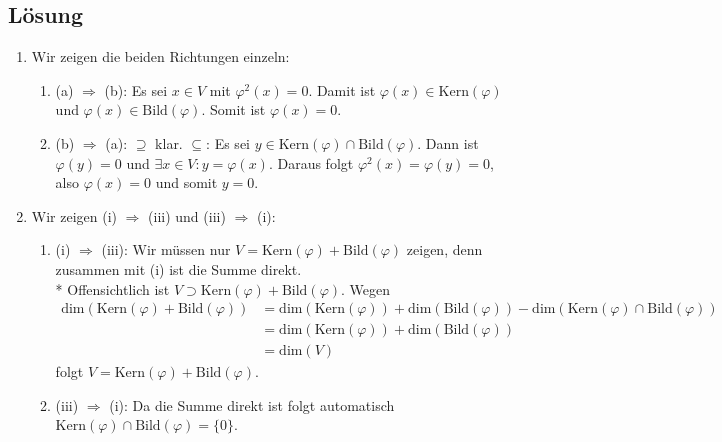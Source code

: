 \subsection{Lösung}
\begin{enumerate}
	\item Wir zeigen die beiden Richtungen einzeln:
	\begin{enumerate}
	 	\item (a) \( \Rightarrow \) (b): Es sei \( x \in V \) mit \( \varphi^2(x) = 0 \). Damit ist \( \varphi(x) \in \text{Kern}(\varphi) \) und \( \varphi(x) \in \text{Bild}(\varphi) \). Somit ist \( \varphi(x) = 0 \).
	 	\item (b) \( \Rightarrow \) (a): \( \supseteq \) klar. \( \subseteq \): Es sei \( y \in \text{Kern}(\varphi) \cap \text{Bild}(\varphi) \). Dann ist \( \varphi(y) = 0 \) und \( \exists x \in V: y = \varphi(x) \). Daraus folgt \( \varphi^2(x) = \varphi(y) = 0 \), also \( \varphi(x) = 0 \) und somit \( y = 0 \).
	 \end{enumerate} 

	 \item Wir zeigen (i) \( \Rightarrow \) (iii) und (iii) \( \Rightarrow \) (i):
	 \begin{enumerate}
	 	\item (i) \( \Rightarrow \) (iii): Wir müssen nur \( V = \text{Kern}(\varphi) + \text{Bild}(\varphi) \) zeigen, denn zusammen mit (i) ist die Summe direkt. \\*
	 		Offensichtlich ist \( V \supset \text{Kern}(\varphi) + \text{Bild}(\varphi) \). Wegen
	 		\begin{align*}
	 		 	\text{dim}(\text{Kern}(\varphi) + \text{Bild}(\varphi)) &= \text{dim}(\text{Kern}(\varphi)) + \text{dim}(\text{Bild}(\varphi)) - \text{dim}(\text{Kern}(\varphi) \cap \text{Bild}(\varphi)) \\
	 		 	 &= \text{dim}(\text{Kern}(\varphi)) + \text{dim}(\text{Bild}(\varphi)) \\
	 		 	 &= \text{dim}(V)
	 		 \end{align*} 
	 		 folgt \( V = \text{Kern}(\varphi) + \text{Bild}(\varphi) \).

	 	\item (iii) \( \Rightarrow \) (i): Da die Summe direkt ist folgt automatisch \( \text{Kern}(\varphi) \cap \text{Bild}(\varphi) = \{ 0 \} \).
	 \end{enumerate}
\end{enumerate}

\newpage